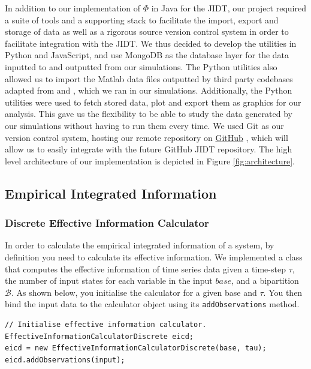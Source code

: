 \documentclass[a4paper,11pt]{article}
\begin{document}
In addition to our implementation of $\Phi$ in Java for the JIDT, our project required a suite of tools and a supporting stack to facilitate the import, export and storage of data as well as a rigorous source version control system in order to facilitate integration with the JIDT. We thus decided to develop the utilities in Python and JavaScript, and use MongoDB \cite{MongoDB} as the database layer for the data inputted to and outputted from our simulations. The Python utilities also allowed us to import the Matlab data files outputted by third party codebases adapted from \cite{Shanahan2010} and \cite{Bhowmik2013}, which we ran in our simulations. Additionally, the Python utilities were used to fetch stored data, plot and export them as graphics for our analysis. This gave us the flexibility to be able to study the data generated by our simulations without having to run them every time. We used Git as our version control system, hosting our remote repository on \href{http://github.com}{GitHub} \cite{GitHub}, which will allow us to easily integrate with the future GitHub JIDT repository. The high level architecture of our implementation is depicted in Figure \ref{fig:architecture}.

\subsection{Empirical Integrated Information}
\label{sec:impl:phi-e}

\subsubsection{Discrete Effective Information Calculator}
\label{sec:impl:ei}

In order to calculate the empirical integrated information of a system, by definition you need to calculate its effective information. We implemented a class that computes the effective information of time series data given a time-step $\tau$, the number of input states for each variable in the input $base$, and a bipartition $\mathcal{B}$. As shown below, you initialise the calculator for a given base and $\tau$. You then bind the input data to the calculator object using its \texttt{addObservations} method.

\begin{verbatim}
// Initialise effective information calculator.
EffectiveInformationCalculatorDiscrete eicd;
eicd = new EffectiveInformationCalculatorDiscrete(base, tau);
eicd.addObservations(input);
\end{verbatim}
\end{document}
